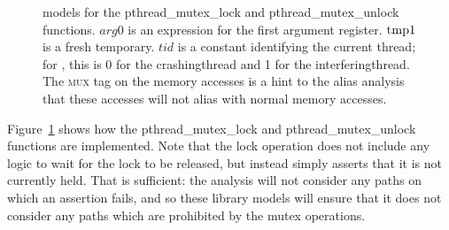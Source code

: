 \begin{figure}
  \centerline{
    {\hfill}
    {\hfill}
  }
  \caption{{\StateMachine} models for the pthread\_mutex\_lock and
    pthread\_mutex\_unlock functions.  $\mathit{arg0}$ is an
    expression for the first argument register.  $\mathrm{tmp1}$ is a
    fresh {\StateMachine} temporary.  $\mathit{tid}$ is a constant
    identifying the current thread; for {\implementation}, this is 0
    for the \gls{crashingthread} and 1 for the
    \gls{interferingthread}.  The \textsc{mux} tag on the memory
    accesses is a hint to the alias analysis that these accesses will
    not alias with normal memory accesses.}
  \label{fig:library_mux}
\end{figure}

Figure~\ref{fig:library_mux} shows how the pthread\_mutex\_lock and
pthread\_mutex\_unlock functions are implemented.  Note that the lock
operation does not include any logic to wait for the lock to be
released, but instead simply asserts that it is not currently held.
That is sufficient: the analysis will not consider any paths on which
an assertion fails, and so these library models will ensure that it
does not consider any paths which are prohibited by the mutex
operations.


